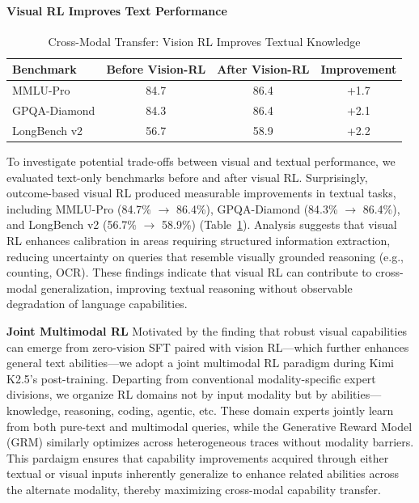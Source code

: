 \paragraph{Visual RL Improves Text Performance}

\begin{table}[h]
\centering
\caption{Cross-Modal Transfer: Vision RL Improves Textual Knowledge}
\begin{tabular}{lccc}
\toprule
\textbf{Benchmark} & \textbf{Before Vision-RL} & \textbf{After Vision-RL} & \textbf{Improvement} \\
\midrule
MMLU-Pro & 84.7 & 86.4 & +1.7 \\
GPQA-Diamond & 84.3 & 86.4 & +2.1 \\
LongBench v2 & 56.7 & 58.9 & +2.2 \\
\bottomrule
\end{tabular}
\label{tab:vision_rl_text}
\end{table}

 To investigate potential trade-offs between visual and textual performance, we evaluated text-only benchmarks before and after visual RL. Surprisingly, outcome-based visual RL produced measurable improvements in textual tasks, including MMLU-Pro (84.7\% $\rightarrow$ 86.4\%), GPQA-Diamond (84.3\% $\rightarrow$ 86.4\%), and LongBench v2 (56.7\% $\rightarrow$ 58.9\%) (Table~\ref{tab:vision_rl_text}).
Analysis suggests that visual RL enhances calibration in areas requiring structured information extraction, reducing uncertainty on queries that resemble visually grounded reasoning (e.g., counting, OCR). These findings indicate that visual RL can contribute to cross-modal generalization, improving textual reasoning without observable degradation of language capabilities.

\textbf{Joint Multimodal RL} Motivated by the finding that robust visual capabilities can emerge from zero-vision SFT paired with vision RL---which further enhances general text abilities---we adopt a joint multimodal RL paradigm during Kimi K2.5's post-training. Departing from conventional modality-specific expert divisions, we organize RL domains not by input modality but by abilities---knowledge, reasoning, coding, agentic, etc. These domain experts jointly learn from both pure-text and multimodal queries, while the Generative Reward Model (GRM) similarly optimizes across heterogeneous traces without modality barriers. This pardaigm ensures that capability improvements acquired through either textual or visual inputs inherently generalize to enhance related abilities across the alternate modality, thereby maximizing cross-modal capability transfer.


